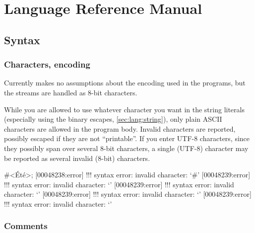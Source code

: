 
\chapter{\us Language Reference Manual}
\label{sec:lang}

\section{Syntax}

\subsection{Characters, encoding}

Currently \us makes no assumptions about the encoding used in the
programs, but the streams are handled as 8-bit characters.

While you are allowed to use whatever character you want in the string
literals (especially using the binary escapes,
\autoref{sec:lang:string}), only plain ASCII characters are
allowed in the program body.  Invalid characters are reported,
possibly escaped if they are not ``printable''.  If you enter UTF-8
characters, since they possibly span over several 8-bit characters, a
single (UTF-8) character may be reported as several invalid (8-bit)
characters.

\begin{urbiscript}[firstnumber=1,escapeinside=<>]
#<Été>;
[00048238:error] !!! syntax error: invalid character: `#'
[00048239:error] !!! syntax error: invalid character: `'
[00048239:error] !!! syntax error: invalid character: `'
[00048239:error] !!! syntax error: invalid character: `'
[00048239:error] !!! syntax error: invalid character: `'
\end{urbiscript}

\subsection{Comments}

